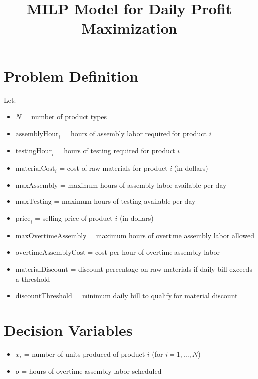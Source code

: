 \documentclass{article}
\begin{document}
\title{MILP Model for Daily Profit Maximization}
\author{}
\date{}
\maketitle

\section*{Problem Definition}

Let:
\begin{itemize}
    \item \( N \) = number of product types
    \item \( \text{assemblyHour}_i \) = hours of assembly labor required for product \( i \)
    \item \( \text{testingHour}_i \) = hours of testing required for product \( i \)
    \item \( \text{materialCost}_i \) = cost of raw materials for product \( i \) (in dollars)
    \item \( \text{maxAssembly} \) = maximum hours of assembly labor available per day
    \item \( \text{maxTesting} \) = maximum hours of testing available per day
    \item \( \text{price}_i \) = selling price of product \( i \) (in dollars)
    \item \( \text{maxOvertimeAssembly} \) = maximum hours of overtime assembly labor allowed
    \item \( \text{overtimeAssemblyCost} \) = cost per hour of overtime assembly labor
    \item \( \text{materialDiscount} \) = discount percentage on raw materials if daily bill exceeds a threshold
    \item \( \text{discountThreshold} \) = minimum daily bill to qualify for material discount
\end{itemize}

\section*{Decision Variables}
\begin{itemize}
    \item \( x_i \) = number of units produced of product \( i \) (for \( i = 1, \ldots, N \))
    \item \( o \) = hours of overtime assembly labor scheduled
\end{itemize}
\end{document}
